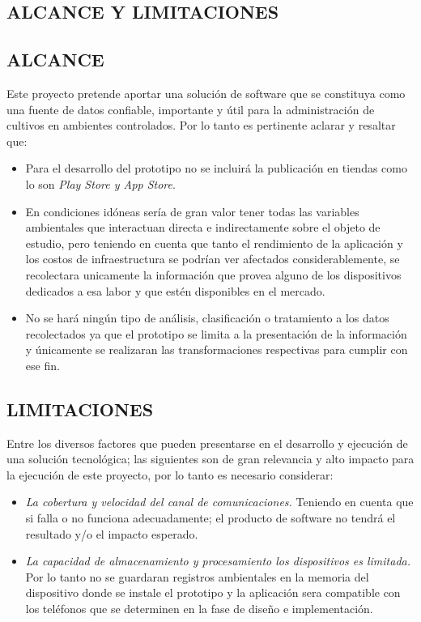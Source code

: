 \begin{center}
\section{ALCANCE Y LIMITACIONES}
\end{center}

\subsection{ALCANCE}

\noindent Este proyecto pretende aportar una soluci\'on de software que se constituya como una fuente de datos confiable, importante y útil para la administración de cultivos en ambientes controlados. Por lo tanto es pertinente aclarar y resaltar que:

\begin{itemize}
	\item Para el desarrollo del prototipo no se incluir\'a la publicaci\'on en tiendas como lo son \textit{Play Store y App Store}.
	\item En condiciones id\'oneas sería de gran valor tener todas las variables ambientales que interactuan directa e indirectamente sobre el objeto de estudio, pero teniendo en cuenta que tanto el rendimiento de la aplicaci\'on  y los costos de infraestructura se podrían ver afectados considerablemente, se recolectara unicamente la informaci\'on que provea alguno de los dispositivos dedicados a esa labor y que est\'en disponibles en el mercado. 
	\item No se har\'a ningún tipo de an\'alisis, clasificación o tratamiento a los datos recolectados ya que el prototipo se limita a la presentaci\'on de la informaci\'on y \'unicamente se realizaran las transformaciones respectivas para cumplir con ese fin.
\end{itemize}

\subsection{LIMITACIONES}

\noindent Entre los diversos factores que pueden presentarse en el desarrollo y ejecución de una solución tecnológica; las siguientes son de gran relevancia y alto impacto para la ejecución de este proyecto, por lo tanto es necesario considerar:

\begin{itemize}
	\item \textit{La cobertura y velocidad del canal de comunicaciones.} Teniendo en cuenta que si falla o no funciona adecuadamente; el producto de software no tendrá el resultado y/o el impacto esperado.
	\item \textit{La capacidad de almacenamiento y procesamiento los dispositivos es limitada.} Por lo tanto no se guardaran registros ambientales en la memoria del dispositivo donde se instale el prototipo y la aplicaci\'on sera compatible con los tel\'efonos que se determinen en la fase de diseño e implementaci\'on.
\end{itemize}